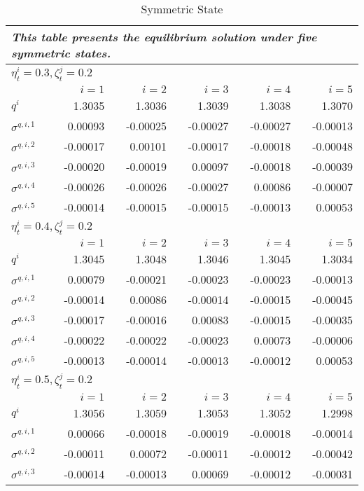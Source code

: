 \documentclass{article}
\begin{document}
\begin{table}[t]
\centering
\caption{Symmetric State}
\scriptsize
\begin{tabular}{@{}lrrrrr@{}}
\toprule
\multicolumn{6}{l}{\textit{This table presents the equilibrium solution under five symmetric states.}} \\
\midrule
\multicolumn{6}{l}{$\eta_{t}^{i}=0.3, \zeta_{t}^{j}=0.2$} \\
& $i=1$ & $i=2$ & $i=3$ & $i=4$ & $i=5$ \\
\midrule
$q^{i}$ & 1.3035 & 1.3036 & 1.3039 & 1.3038 & 1.3070 \\
$\sigma^{q,i,1}$ & 0.00093 & -0.00025 & -0.00027 & -0.00027 & -0.00013 \\
$\sigma^{q,i,2}$ & -0.00017 & 0.00101 & -0.00017 & -0.00018 & -0.00048 \\
$\sigma^{q,i,3}$ & -0.00020 & -0.00019 & 0.00097 & -0.00018 & -0.00039 \\
$\sigma^{q,i,4}$ & -0.00026 & -0.00026 & -0.00027 & 0.00086 & -0.00007 \\
$\sigma^{q,i,5}$ & -0.00014 & -0.00015 & -0.00015 & -0.00013 & 0.00053 \\
\midrule
\multicolumn{6}{l}{$\eta_{t}^{i}=0.4, \zeta_{t}^{j}=0.2$} \\
& $i=1$ & $i=2$ & $i=3$ & $i=4$ & $i=5$ \\
\midrule
$q^{i}$ & 1.3045 & 1.3048 & 1.3046 & 1.3045 & 1.3034 \\
$\sigma^{q,i,1}$ & 0.00079 & -0.00021 & -0.00023 & -0.00023 & -0.00013 \\
$\sigma^{q,i,2}$ & -0.00014 & 0.00086 & -0.00014 & -0.00015 & -0.00045 \\
$\sigma^{q,i,3}$ & -0.00017 & -0.00016 & 0.00083 & -0.00015 & -0.00035 \\
$\sigma^{q,i,4}$ & -0.00022 & -0.00022 & -0.00023 & 0.00073 & -0.00006 \\
$\sigma^{q,i,5}$ & -0.00013 & -0.00014 & -0.00013 & -0.00012 & 0.00053 \\
\midrule
\multicolumn{6}{l}{$\eta_{t}^{i}=0.5, \zeta_{t}^{j}=0.2$} \\
& $i=1$ & $i=2$ & $i=3$ & $i=4$ & $i=5$ \\
\midrule
$q^{i}$ & 1.3056 & 1.3059 & 1.3053 & 1.3052 & 1.2998 \\
$\sigma^{q,i,1}$ & 0.00066 & -0.00018 & -0.00019 & -0.00018 & -0.00014 \\
$\sigma^{q,i,2}$ & -0.00011 & 0.00072 & -0.00011 & -0.00012 & -0.00042 \\
$\sigma^{q,i,3}$ & -0.00014 & -0.00013 & 0.00069 & -0.00012 & -0.00031 \\

\end{tabular}
\end{table}
\end{document}
